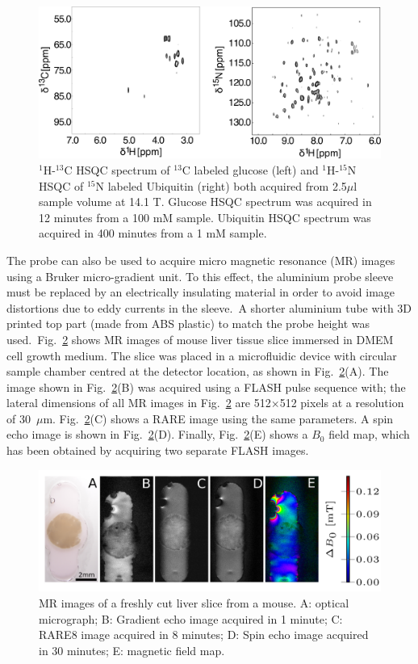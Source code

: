 \documentclass[preprint,5p]{elsarticle}
\newcommand{\fig}[1]{Fig.~\ref{#1}}
\begin{document}
\begin{figure} \centering
\includegraphics[width=\linewidth,keepaspectratio=true]{./figures/ms5n17-tlp-sp-180612-HSQCspect.png}
\caption{ $^1$H-$^{13}$C HSQC spectrum of $^{13}$C labeled glucose (left) and
$^1$H-$^{15}$N HSQC of $^{15}$N labeled Ubiquitin (right) both acquired from
2.5$\mu$l sample volume at 14.1 T. Glucose HSQC spectrum was acquired in 12
minutes from a 100 mM sample. Ubiquitin HSQC spectrum was acquired in 400
minutes from a 1 mM sample.} \label{fig:HSQC} \end{figure}
\cbdelete
The probe can also be used to acquire micro magnetic resonance (MR) images using
a Bruker micro-gradient unit. To this effect, the aluminium probe sleeve must be
replaced by an electrically insulating material in order to avoid image
distortions due to eddy currents in the sleeve.\cbstart\
A shorter aluminium tube with 3D printed top part (made from ABS plastic)
to match the probe height was used.\cbend\ \fig{fig:tisli} shows MR images
of mouse liver tissue slice immersed in DMEM cell growth medium. The slice was
placed in a microfluidic device with circular sample chamber centred at the
detector location, as shown in \fig{fig:tisli}(A). The image shown in
\fig{fig:tisli}(B) was acquired using a FLASH pulse sequence with; the lateral dimensions of all MR images in \fig{fig:tisli} are 512$\times$512 pixels at a resolution of 30~$\mu$m. \fig{fig:tisli}(C) shows a
RARE image using the same parameters. A spin echo image is shown in
\fig{fig:tisli}(D). Finally, \fig{fig:tisli}(E) shows a
$B_0$ field map, which has been obtained by acquiring two separate FLASH images.


\begin{figure}
\centering
\includegraphics[width=\linewidth,keepaspectratio=true]{./figures/ms5n17-tisli-im-180511.png}
\caption{MR images of a freshly cut liver slice from a mouse. A: optical micrograph; B: Gradient echo image acquired in 1 minute; C: RARE8 image acquired in 8 minutes; D: Spin echo image acquired in 30 minutes; E: magnetic field map.}
\label{fig:tisli}
\end{figure}
\end{document}
